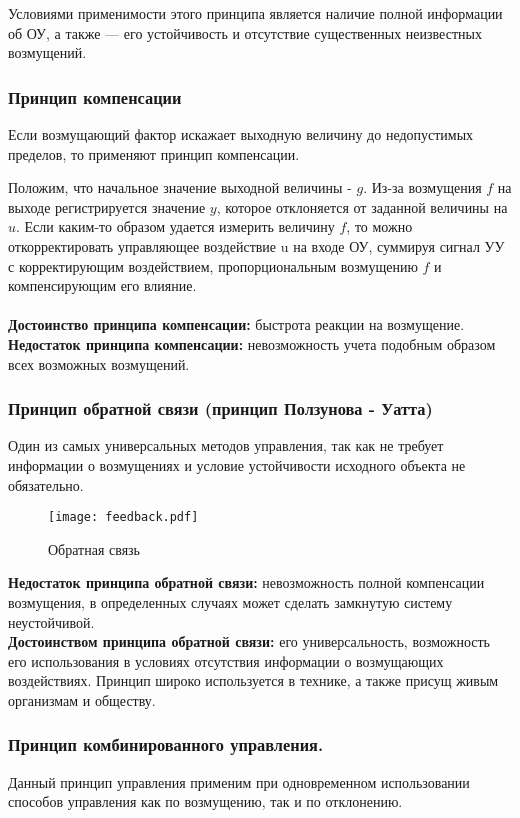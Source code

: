\documentclass[../../TAU.tex]{subfiles}
\begin{document}
    Условиями применимости этого принципа является наличие полной информации об ОУ, а также --- его устойчивость и отсутствие существенных неизвестных возмущений.

\subsubsection{Принцип компенсации}
    Если возмущающий фактор искажает выходную величину до недопустимых пределов, то применяют принцип компенсации. \par
    Положим, что начальное значение выходной величины - $g$. Из-за возмущения $f$ на выходе регистрируется значение $y$, которое отклоняется от заданной величины на $u$. 
    Если каким-то образом удается измерить величину $f$, то можно откорректировать управляющее воздействие u на входе ОУ, суммируя сигнал УУ с корректирующим воздействием, пропорциональным возмущению $f$ и компенсирующим его влияние.\\\\
    {\bf Достоинство принципа компенсации:} быстрота реакции на возмущение. \\
    {\bf Недостаток принципа компенсации:} невозможность учета подобным образом всех возможных возмущений.

\subsubsection{Принцип обратной связи (принцип Ползунова - Уатта)}
    Один из самых универсальных методов управления, так как не требует информации о возмущениях и условие устойчивости исходного объекта не обязательно.


    \begin{figure}[h]
    \centering
    \texttt{[image: feedback.pdf]}
    \caption{Обратная связь}
    \centering
    \end{figure}

    {\bf Недостаток принципа обратной связи:} невозможность полной компенсации возмущения, в определенных случаях может сделать замкнутую систему неустойчивой. \\
    {\bf Достоинством принципа обратной связи:} его универсальность, возможность его использования в условиях отсутствия информации о возмущающих воздействиях. Принцип широко используется в технике, а также присущ живым организмам и обществу.


\subsubsection{Принцип комбинированного управления.}
    Данный принцип управления применим при одновременном использовании способов управления как по возмущению, так и по отклонению.
\end{document}
